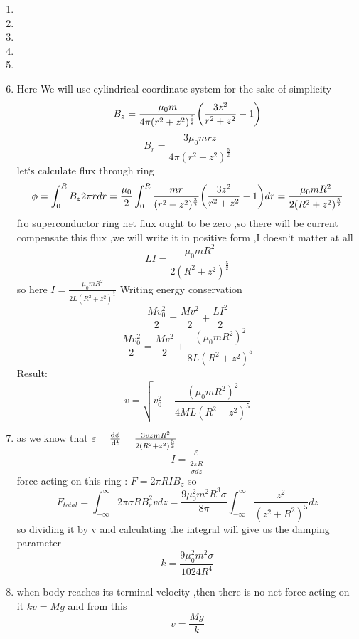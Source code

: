 \begin{sol}
    \begin{enumerate}[label=\textbf{(\alph*)}]
        \item 
        \item
        \item 
        \item
        \item 
        \item
        Here We will use cylindrical coordinate system for the sake of simplicity 
$$B_z=\frac{\mu_0 m}{4\pi(r^2+z^2)^{\frac{3}{2}}}\qty(\frac{3z^2}{r^2+z^2}-1)$$
$$B_r=\frac{3\mu_0 mrz}{4\pi(r^2+z^2)^{\frac{5}{2}}}$$
let`s calculate flux through ring 
$$\phi=\int_{0}^{R}B_z2\pi rdr=\frac{\mu_0}{2}\int_{0}^{R}\frac{mr}{(r^2+z^2)^{\frac{3}{2}}}\qty(\frac{3z^2}{r^2+z^2}-1)dr=\frac{\mu_0mR^2}{2(R^2+z^2)^{\frac{5}{2}}}$$ 
fro superconductor ring net flux ought to be zero ,so there will be current compensate this flux ,we will write it in positive form ,I doesn`t matter at all 
$$LI=\frac{\mu_0mR^2}{2(R^2+z^2)^{\frac{5}{2}}}$$
so here $I=\frac{\mu_0mR^2}{2L(R^2+z^2)^{\frac{5}{2}}}$
Writing energy conservation 
$$\frac{Mv_0^2}{2}=\frac{Mv^2}{2}+\frac{LI^2}{2}$$
$$\frac{Mv_0^2}{2}=\frac{Mv^2}{2}+\frac{(\mu_0mR^2)^2}{8L(R^2+z^2)^5}$$
Result: 
$$v=\sqrt{v_0^2-\frac{(\mu_0mR^2)^2}{4ML(R^2+z^2)^{5}}}$$
        \item 
        as we know that $\varepsilon=\dv{\phi}{t}=\frac{3vzmR^2}{2(R^2+z^2)^{\frac{5}{2}}}$
$$I=\frac{\varepsilon}{\frac{2\pi R}{\sigma dz}}$$
force acting on this ring :
$F=2\pi RIB_z$ 
so $$F_{total}=\int_{-\infty}^{\infty}2\pi \sigma R B_r^2 vdz=\frac{9\mu_0^2m^2R^3\sigma}{8\pi} \int_{-\infty}^{\infty}\frac{z^2}{(z^2+R^2)^5}dz$$   
so dividing it by v and calculating the integral will give us the damping parameter 
$$k=\frac{9\mu_0^2m^2 \sigma}{1024R^4}$$
        \item
        when body reaches its terminal velocity ,then there is no  net force acting on it 
        $kv=Mg$ and from this $$v=\frac{Mg}{k}$$
            
    \end{enumerate}
\vspace{15mm}
\end{sol}